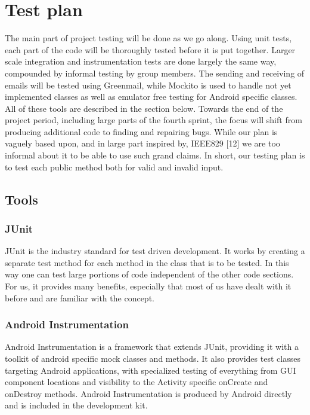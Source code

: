 \section{Test plan}

The main part of project testing will be done as we go along. Using unit tests, each part of the code will be thoroughly tested before it is put together. Larger scale integration and instrumentation tests are done largely the same way, compounded by informal testing by group members. The sending and receiving of emails will be tested using Greenmail, while Mockito is used to handle not yet implemented classes as well as emulator free testing for Android specific classes. All of these tools are described in the section below. Towards the end of the project period, including large parts of the fourth sprint, the focus will shift from producing additional code to finding and repairing bugs. While our plan is vaguely based upon, and in large part inspired by, IEEE829 [12] we are too informal about it to be able to use such grand claims. In short, our testing plan is to test each public method both for valid and invalid input.

\subsection{Tools}
\subsubsection{JUnit}
JUnit is the industry standard for test driven development. It works by creating a separate test method for each method in the class that is to be tested. In this way one can test large portions of code independent of the other code sections. For us, it provides many benefits, especially that most of us have dealt with it before and are familiar with the concept.

\subsubsection{Android Instrumentation}
Android Instrumentation is a framework that extends JUnit, providing it with a toolkit of android specific mock classes and methods. It also provides test classes targeting Android applications, with specialized testing of everything from GUI component locations and visibility to the Activity specific onCreate and onDestroy methods. Android Instrumentation is produced by Android directly and is included in the development kit.

